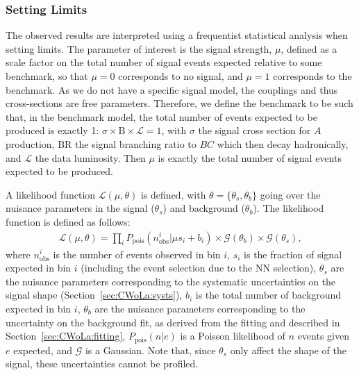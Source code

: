 \subsubsection{Setting Limits}
\label{sec:CWoLa:limits}
The observed results are interpreted using a frequentist statistical analysis when setting limits.
The parameter of interest is the signal strength, $\mu$, defined as a scale factor on the total number of signal events expected relative to some benchmark, so that $\mu=0$ corresponds to no signal, and $\mu=1$ corresponds to the benchmark.
As we do not have a specific signal model, the couplings and thus cross-sections are free parameters.
Therefore, we define the benchmark to be such that, in the benchmark model, the total number of events expected to be produced is exactly 1: $\sigma\times\text{B}\times\mathcal{L}=1$, with $\sigma$ the signal cross section for $A$ production, $\text{BR}$ the signal branching ratio to $BC$ which then decay hadronically, and $\mathcal{L}$ the data luminosity.
Then $\mu$ is exactly the total number of signal events expected to be produced.

A likelihood function $\mathcal{L}(\mu,\theta)$ is defined, with $\theta=\{\theta_s,\theta_b\}$ going over the nuisance parameters in the signal ($\theta_s$) and background ($\theta_b$).
The likelihood function is defined as follows:
\begin{align}
  \mathcal{L}(\mu,\theta) = \prod_i P_\text{pois}(n_\text{obs}^i|\mu s_i + b_i)\times\mathcal{G}(\theta_b)\times\mathcal{G}(\theta_s),
  \label{eqn:CWoLa:likelihood}
\end{align}
where $n_\text{obs}^i$ is the number of events observed in bin $i$,
$s_i$ is the fraction of signal expected in bin $i$ (including the event selection due to the NN selection),
$\theta_s$ are the nuisance parameters corresponding to the systematic uncertainties on the signal shape (Section~\ref{sec:CWoLa:systs}),
$b_i$ is the total number of background expected in bin $i$,
$\theta_b$ are the nuisance parameters corresponding to the uncertainty on the background fit, as derived from the fitting and described in Section~\ref{sec:CWoLa:fitting},
$P_\text{pois}(n|e)$ is a Poisson likelihood of $n$ events given $e$ expected, and $\mathcal{G}$ is a  Gaussian.
Note that, since $\theta_s$ only affect the shape of the signal, these uncertainties cannot be profiled.

